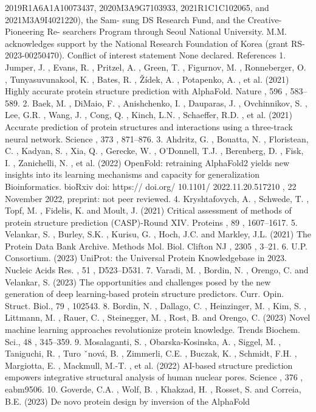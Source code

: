 2019R1A6A1A10073437,
2020M3A9G7103933,
2021R1C1C102065, and 2021M3A9I4021220), the Sam-
sung DS Research Fund, and the Creative-Pioneering Re-
searchers Program through Seoul National University. M.M.
acknowledges support by the National Research Foundation
of Korea (grant RS-2023-00250470).
Conflict of interest statement
None declared.
References
1. Jumper, J. , Evans, R. , Pritzel, A. , Green, T. , Figurnov, M. ,
Ronneberger, O. , Tunyasuvunakool, K. , Bates, R. , Žídek, A. ,
Potapenko, A. , et al. (2021) Highly accurate protein structure
prediction with AlphaFold. Nature , 596 , 583–589.
2. Baek, M. , DiMaio, F. , Anishchenko, I. , Dauparas, J. , Ovchinnikov, S. ,
Lee, G.R. , Wang, J. , Cong, Q. , Kinch, L.N. , Schaeffer, R.D. , et al.
(2021) Accurate prediction of protein structures and interactions
using a three-track neural network. Science , 373 , 871–876.
3. Ahdritz, G. , Bouatta, N. , Floristean, C. , Kadyan, S. , Xia, Q. ,
Gerecke, W. , O’Donnell, T.J. , Berenberg, D. , Fisk, I. , Zanichelli, N. ,
et al. (2022) OpenFold: retraining AlphaFold2 yields new insights
into its learning mechanisms and capacity for generalization
Bioinformatics. bioRxiv doi:
https:// doi.org/ 10.1101/ 2022.11.20.517210 , 22 November 2022,
preprint: not peer reviewed.
4. Kryshtafovych, A. , Schwede, T. , Topf, M. , Fidelis, K. and Moult, J.
(2021) Critical assessment of methods of protein structure
prediction (CASP)-Round XIV. Proteins , 89 , 1607–1617.
5. Velankar, S. , Burley, S.K. , Kurisu, G. , Hoch, J.C. and Markley, J.L.
(2021) The Protein Data Bank Archive. Methods Mol. Biol.
Clifton NJ , 2305 , 3–21.
6. U.P. Consortium. (2023) UniProt: the Universal Protein
Knowledgebase in 2023. Nucleic Acids Res. , 51 , D523–D531.
7. Varadi, M. , Bordin, N. , Orengo, C. and Velankar, S. (2023) The
opportunities and challenges posed by the new generation of deep
learning-based protein structure predictors. Curr. Opin. Struct.
Biol., 79 , 102543.
8. Bordin, N. , Dallago, C. , Heinzinger, M. , Kim, S. , Littmann, M. ,
Rauer, C. , Steinegger, M. , Rost, B. and Orengo, C. (2023) Novel
machine learning approaches revolutionize protein knowledge.
Trends Biochem. Sci., 48 , 345–359.
9. Mosalaganti, S. , Obarska-Kosinska, A. , Siggel, M. , Taniguchi, R. ,
Turo ˇnová, B. , Zimmerli, C.E. , Buczak, K. , Schmidt, F.H. ,
Margiotta, E. , Mackmull, M.-T. , et al. (2022) AI-based structure
prediction empowers integrative structural analysis of human
nuclear pores. Science , 376 , eabm9506.
10. Goverde, C.A. , Wolf, B. , Khakzad, H. , Rosset, S. and Correia, B.E.
(2023) De novo protein design by inversion of the AlphaFold
